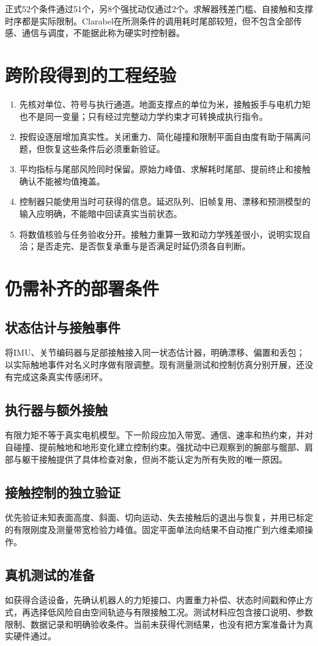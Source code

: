 正式52个条件通过51个，另8个强扰动仅通过2个。求解器残差门槛、自接触和支撑时序都是实际限制。Clarabel在所测条件的调用耗时尾部较短，但不包含全部传感、通信与调度，不能据此称为硬实时控制器。
\section{跨阶段得到的工程经验}
\begin{enumerate}
\item 先核对单位、符号与执行通道。地面支撑点的单位为米，接触扳手与电机力矩也不是同一变量；只有经过完整动力学约束才可转换成执行指令。
\item 按假设逐层增加真实性。关闭重力、简化碰撞和限制平面自由度有助于隔离问题，但恢复这些条件后必须重新验证。
\item 平均指标与尾部风险同时保留。原始力峰值、求解耗时尾部、提前终止和接触确认不能被均值掩盖。
\item 控制器只能使用当时可获得的信息。延迟队列、旧帧复用、漂移和预测模型的输入应明确，不能暗中回读真实当前状态。
\item 将数值核验与任务验收分开。接触力重算一致和动力学残差很小，说明实现自洽；是否走完、是否恢复承重与是否满足时延仍须各自判断。
\end{enumerate}
\section{仍需补齐的部署条件}
\subsection{状态估计与接触事件}
将IMU、关节编码器与足部接触接入同一状态估计器，明确漂移、偏置和丢包；以实际触地事件对名义时序做有限调整。现有测量测试和控制仿真分别开展，还没有完成这条真实传感闭环。
\subsection{执行器与额外接触}
有限力矩不等于真实电机模型。下一阶段应加入带宽、通信、速率和热约束，并对自碰撞、提前触地和地形变化建立控制约束。强扰动中已观察到的腕部与髋部、肩部与躯干接触提供了具体检查对象，但尚不能认定为所有失败的唯一原因。
\subsection{接触控制的独立验证}
优先验证未知表面高度、斜面、切向运动、失去接触后的退出与恢复，并用已标定的有限刚度及测量带宽检验力峰值。固定平面单法向结果不自动推广到六维柔顺操作。
\subsection{真机测试的准备}
如获得合适设备，先确认机器人的力矩接口、内置重力补偿、状态时间戳和停止方式，再选择低风险自由空间轨迹与有限接触工况。测试材料应包含接口说明、参数限制、数据记录和明确验收条件。当前未获得代测结果，也没有把方案准备计为真实硬件通过。
